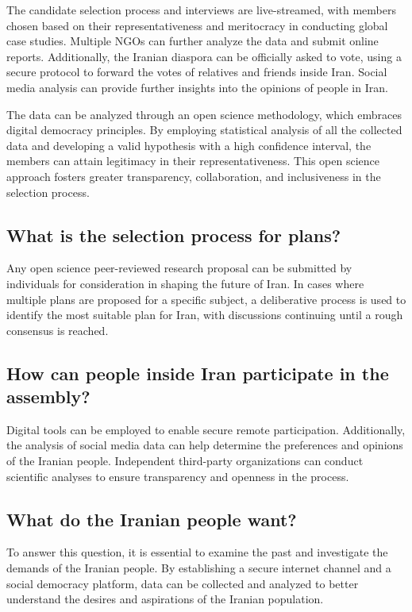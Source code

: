 \documentclass{IEEEtran}
\begin{document}
The candidate selection process and interviews are live-streamed, with members chosen based on their representativeness and meritocracy in conducting global case studies. Multiple NGOs can further analyze the data and submit online reports. Additionally, the Iranian diaspora can be officially asked to vote, using a secure protocol to forward the votes of relatives and friends inside Iran. Social media analysis can provide further insights into the opinions of people in Iran.

The data can be analyzed through an open science methodology, which embraces digital democracy principles. By employing statistical analysis of all the collected data and developing a valid hypothesis with a high confidence interval, the members can attain legitimacy in their representativeness. This open science approach fosters greater transparency, collaboration, and inclusiveness in the selection process.
\subsection{What is the selection process for plans?}
Any open science peer-reviewed research proposal can be submitted by individuals for consideration in shaping the future of Iran. In cases where multiple plans are proposed for a specific subject, a deliberative process is used to identify the most suitable plan for Iran, with discussions continuing until a rough consensus is reached.

\subsection{How can people inside Iran participate in the assembly?}
Digital tools can be employed to enable secure remote participation. Additionally, the analysis of social media data can help determine the preferences and opinions of the Iranian people. Independent third-party organizations can conduct scientific analyses to ensure transparency and openness in the process.

\subsection{What do the Iranian people want?}
To answer this question, it is essential to examine the past and investigate the demands of the Iranian people. By establishing a secure internet channel and a social democracy platform, data can be collected and analyzed to better understand the desires and aspirations of the Iranian population.
\end{document}
